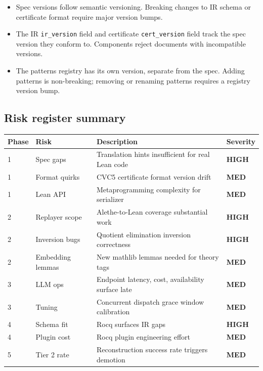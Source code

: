 \documentclass[11pt,letterpaper]{article}
\newcommand{\highrisk}{\textcolor{riskhigh}{\textbf{HIGH}}}
\newcommand{\medrisk}{\textcolor{riskmed}{\textbf{MED}}}
\begin{document}
\begin{itemize}
  \item Spec versions follow semantic versioning. Breaking changes to
        IR schema or certificate format require major version bumps.
  \item The IR \texttt{ir\_version} field and certificate
        \texttt{cert\_version} field track the spec version they
        conform to. Components reject documents with incompatible
        versions.
  \item The patterns registry has its own version, separate from the
        spec. Adding patterns is non-breaking; removing or renaming
        patterns requires a registry version bump.
\end{itemize}

\subsection{Risk register summary}

\begin{tabularx}{\textwidth}{@{}llXl@{}}
\toprule
\textbf{Phase} & \textbf{Risk} & \textbf{Description} & \textbf{Severity} \\
\midrule
1 & Spec gaps & Translation hints insufficient for real Lean code & \highrisk \\
1 & Format quirks & CVC5 certificate format version drift & \medrisk \\
1 & Lean API & Metaprogramming complexity for serializer & \medrisk \\
2 & Replayer scope & Alethe-to-Lean coverage substantial work & \highrisk \\
2 & Inversion bugs & Quotient elimination inversion correctness & \highrisk \\
2 & Embedding lemmas & New mathlib lemmas needed for theory tags & \medrisk \\
3 & LLM ops & Endpoint latency, cost, availability surface late & \medrisk \\
3 & Tuning & Concurrent dispatch grace window calibration & \medrisk \\
4 & Schema fit & Rocq surfaces IR gaps & \highrisk \\
4 & Plugin cost & Rocq plugin engineering effort & \medrisk \\
5 & Tier 2 rate & Reconstruction success rate triggers demotion & \medrisk \\
\bottomrule
\end{tabularx}
\end{document}

